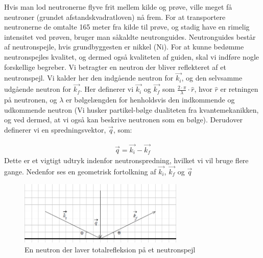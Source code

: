 \documentclass[12pt,oneside,a4paper]{article}
\begin{document}
{{{{{Hvis man lod neutronerne flyve frit mellem kilde og prøve, ville meget få neutroner (grundet afstandskvadratloven) nå frem. For at transportere neutronerne de omtalte 165 meter fra kilde til prøve, og stadig have en rimelig intensitet ved prøven, bruger man såkaldte neutronguides. Neutronguides består af neutronspejle, hvis grundbyggesten er nikkel (Ni).
For at kunne bedømme neutronspejles kvalitet, og dermed også kvaliteten af guiden, skal vi indføre nogle forskellige begreber. Vi betragter en neutron der bliver reflekteret af et neutronspejl. Vi kalder her den indgående neutron for $\vec{k_i}$, og den selvsamme udgående neutron for  $\vec{k_f}$. Her definerer vi $\vec{k_i}$ og $\vec{k_f}$ som  $ {\frac{2 \cdot \pi}{\lambda}} \cdot \hat{r}$, hvor $\hat{r}$ er retningen på neutronen, og $\lambda$ er bølgelængden for henholdsvis den indkommende og udkommende neutron (Vi husker partikel-bølge dualiteten fra kvantemekanikken, og ved dermed, at vi også kan beskrive neutronen som en bølge). Derudover definerer vi en spredningsvektor, $\vec{q}$, som:

\begin{align}
\vec{q}=\vec{k_i}-\vec{k_f}
\end{align}
Dette er et vigtigt udtryk indenfor neutronspredning, hvilket vi vil bruge flere gange. Nedenfor ses en geometrisk fortolkning af $\vec{k_i}$, $\vec{k_f}$  og $ \vec{q}$

\begin{figure}[H]
\centering
\includegraphics[width=0.7\textwidth]{billede3.png}
\caption{En neutron der laver totalrefleksion på et neutronspejl}
\end{figure}

}}}}}
\end{document}
